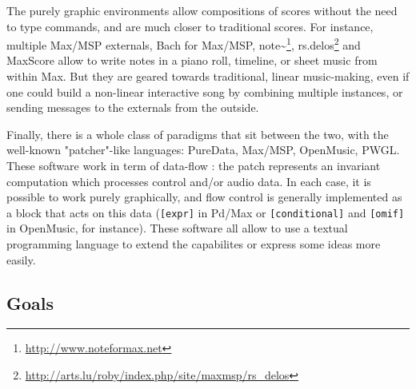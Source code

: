 \documentclass{article}
\begin{document}
    The purely graphic environments allow compositions of scores without the need to type commands, and are much closer to traditional scores. For instance, multiple Max/MSP externals, Bach for Max/MSP\cite{agostini2012gestures}, note\textasciitilde\footnote{\url{http://www.noteformax.net}}, rs.delos\footnote{\url{http://arts.lu/roby/index.php/site/maxmsp/rs_delos}} and MaxScore\cite{didkovsky2008maxscore} allow to write notes in a piano roll, timeline, or sheet music from within Max. But they are geared towards traditional, linear music-making, even if one could build a non-linear interactive song by combining multiple instances, or sending messages to the externals from the outside.
    
    Finally, there is a whole class of paradigms that sit between the two, with the well-known "patcher"-like languages: PureData, Max/MSP, OpenMusic\cite{bresson2011openmusic}, PWGL\cite{laurson2009overview}. These software work in term of data-flow : the patch represents an invariant computation which processes control and/or audio data. In each case, it is possible to work purely graphically, and flow control is generally implemented as a block that acts on this data (\texttt{[expr]} in Pd/Max or \texttt{[conditional]} and \texttt{[omif]} in OpenMusic, for instance). These software all allow to use a textual programming language to extend the capabilites or express some ideas more easily.
	\subsection{Goals}
	
\end{document}
